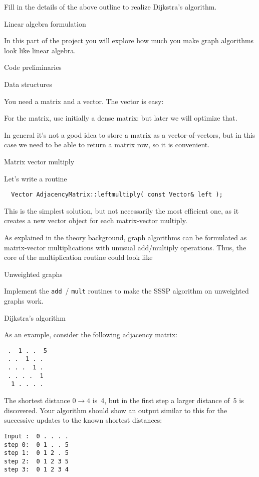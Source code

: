 \begin{exercise}
  Fill in the details of the above outline
  to realize Dijkstra's algorithm.
\end{exercise}

 {Linear algebra formulation}

In this part of the project you will explore
how much you make graph algorithms look like
linear algebra.

 {Code preliminaries}

 {Data structures}

You need a matrix and a vector. The vector is easy:

For the matrix, use initially a dense matrix:
but later we will optimize that.

\begin{remark}
  In general it's not a good idea to store a matrix
  as a vector-of-vectors, but in this case we need to be able
  to return a matrix row, so it is convenient.
\end{remark}

 {Matrix vector multiply}

Let's write a routine
\begin{lstlisting}
  Vector AdjacencyMatrix::leftmultiply( const Vector& left );
\end{lstlisting}
This is the simplest solution, but not necessarily the most efficient one,
as it creates a new vector object for each matrix-vector multiply.

As explained in the theory background, graph algorithms can be formulated
as matrix-vector multiplications with unusual add/multiply operations.
Thus, the core of the multiplication routine could look like

 {Unweighted graphs}

\begin{exercise}
  Implement the \lstinline{add}~/ \lstinline{mult} routines
  to make the \ac{SSSP} algorithm on unweighted graphs work.
\end{exercise}

 {Dijkstra's algorithm}

As an example, consider the following adjacency matrix:
\begin{verbatim}
 .  1 . .  5
 . .  1 . .
 . . .  1 .
 . . . .  1
  1 . . . .
\end{verbatim}
The shortest distance $0\rightarrow 4$ is~4,
but in the first step a larger distance of~5
is discovered.
Your algorithm should show an output similar to this
for the successive updates to the known shortest distances:
\begin{verbatim}
Input :  0 . . . .
step 0:  0 1 . . 5
step 1:  0 1 2 . 5
step 2:  0 1 2 3 5
step 3:  0 1 2 3 4
\end{verbatim}

